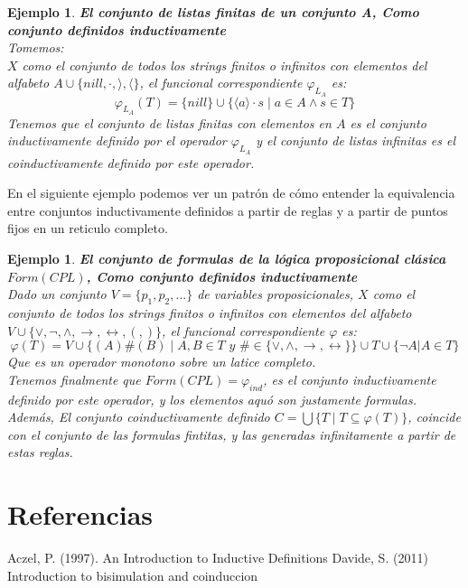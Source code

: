 \documentclass[executivepaper]{article}
\newtheorem{ejemplo}[propo]{Ejemplo}
\begin{document}
\begin{ejemplo}\textbf{El conjunto de listas finitas de un conjunto A, Como conjunto definidos inductivamente}\\
Tomemos:\\ 
    $X$ como el conjunto de todos los strings finitos o infinitos con elementos del alfabeto $A\cup\{nill, \cdot, \rangle, \langle\}$, el funcional correspondiente $\varphi_{L_A}$ es:
    $$\varphi_{L_A}(T) = \{ nill\} \cup \{\langle a\rangle \cdot s \mid a\in A \land s \in T \}$$
Tenemos que el conjunto de listas finitas con elementos en $A$ es el conjunto inductivamente definido por el operador $\varphi_{L_A}$ y el conjunto de listas infinitas es el coinductivamente definido por este operador.
\end{ejemplo}

En el siguiente ejemplo podemos ver un patrón de cómo entender la equivalencia entre conjuntos inductivamente definidos a partir de reglas y a partir de puntos fijos en un reticulo completo.

\begin{ejemplo}\textbf{El conjunto de formulas de la lógica proposicional clásica $Form(CPL)$, Como conjunto definidos inductivamente}\\
    Dado un conjunto $V = \{p_1, p_2,...\}$ de variables proposicionales, $X$ como el conjunto de todos los strings finitos o infinitos con elementos del alfabeto $V\cup\{\lor, \lnot, \land, \rightarrow, \leftrightarrow, (, )\}$, el funcional correspondiente $\varphi$ es:
    $$\varphi(T) = V \cup \{(A) \# (B) \mid A , B\in T \,\,{y}\,\, \#\in \{\lor, \land, \rightarrow, \leftrightarrow\}\}\cup T \cup \{\lnot A|A\in T\}$$
    Que es un operador monotono sobre un latice completo.\\
    Tenemos finalmente que $Form(CPL) = \varphi_{ind}$, es el conjunto inductivamente definido por este operador, y los elementos aquó son justamente formulas.\\    
    Además, El conjunto coinductivamente definido ${C} = \bigcup \{T \mid T\subseteq\varphi(T)\}$, coincide con el conjunto de las formulas fintitas, y las generadas infinitamente a partir de estas reglas.
\end{ejemplo}



\newpage
\section{Referencias}
\begin{thebibliography}{9}
    Aczel, P. (1997). 
    An Introduction to Inductive Definitions
    Davide, S. (2011)
    Introduction to bisimulation and coinduccion
\end{thebibliography}
\end{document}
